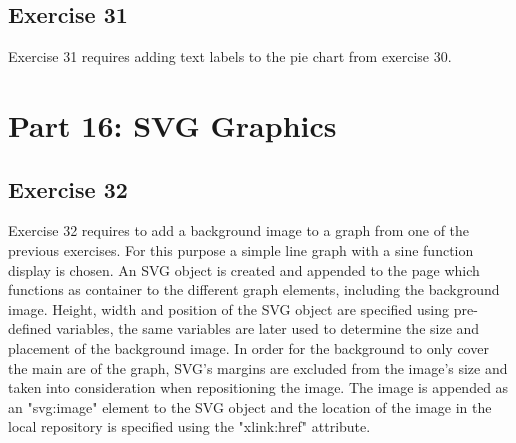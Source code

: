 \documentclass[11pt]{article}   	%
\begin{document}
\subsection{ Exercise 31}
Exercise 31 requires adding text labels to the pie chart from exercise 30.


\section{Part 16: SVG Graphics}
\subsection{ Exercise 32}

Exercise 32 requires to add a background image to a graph from one of the previous exercises. For this purpose a simple line graph with a sine function display is chosen. An SVG object is created and appended to the page which functions as container to the different graph elements, including the background image. Height, width and position of the SVG object are specified using pre-defined variables, the same variables are later used to determine the size and placement of the background image. In order for the background to only cover the main are of the graph, SVG's margins are excluded from the image's size and taken into consideration when repositioning the image. The image is appended as an "svg:image" element to the SVG object and the location of the image in the local repository is specified using the "xlink:href" attribute.     
\end{document}
